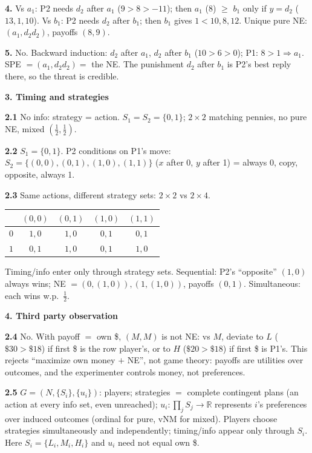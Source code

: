\documentclass[12pt]{article}
\begin{document}
\textbf{4.} Vs $a_1$: P2 needs $d_2$ after $a_1$ ($9>8>-11$); then $a_1$ (8) $\ge$ $b_1$ only if $y=d_2$ ($13,1,10$). Vs $b_1$: P2 needs $d_2$ after $b_1$; then $b_1$ gives $1<10,8,12$. Unique pure NE: $(a_1, d_2d_2)$, payoffs $(8,9)$.

\textbf{5.} No. Backward induction: $d_2$ after $a_1$, $d_2$ after $b_1$ ($10>6>0$); P1: $8>1\Rightarrow a_1$. SPE $=(a_1,d_2d_2)=$ the NE. The punishment $d_2$ after $b_1$ is P2's best reply there, so the threat is credible.

\medskip
\textbf{3. Timing and strategies}

\textbf{2.1} No info: strategy = action. $S_1=S_2=\{0,1\}$; $2\times2$ matching pennies, no pure NE, mixed $(\tfrac12,\tfrac12)$.

\textbf{2.2} $S_1=\{0,1\}$. P2 conditions on P1's move: $S_2=\{(0,0),(0,1),(1,0),(1,1)\}$ ($x$ after 0, $y$ after 1) = always 0, copy, opposite, always 1.

\textbf{2.3} Same actions, different strategy sets: $2\times2$ vs $2\times4$.
\begin{center}
\begin{tabular}{r|cccc}
 & $(0,0)$ & $(0,1)$ & $(1,0)$ & $(1,1)$ \\ \hline
$0$ & $1,0$ & $1,0$ & $0,1$ & $0,1$ \\
$1$ & $0,1$ & $1,0$ & $0,1$ & $1,0$
\end{tabular}
\end{center}
Timing/info enter only through strategy sets. Sequential: P2's ``opposite'' $(1,0)$ always wins; NE $=(0,(1,0)),(1,(1,0))$, payoffs $(0,1)$. Simultaneous: each wins w.p.\ $\tfrac12$.

\medskip
\textbf{4. Third party observation}

\textbf{2.4} No. With payoff $=$ own \$, $(M,M)$ is not NE: vs $M$, deviate to $L$ ($\$30>\$18$) if first \$ is the row player's, or to $H$ ($\$20>\$18$) if first \$ is P1's. This rejects ``maximize own money $+$ NE'', not game theory: payoffs are utilities over outcomes, and the experimenter controls money, not preferences.

\textbf{2.5} $G=(N,\{S_i\},\{u_i\})$: players; strategies $=$ complete contingent plans (an action at every info set, even unreached); $u_i:\prod_j S_j\to\mathbb{R}$ represents $i$'s preferences over induced outcomes (ordinal for pure, vNM for mixed). Players choose strategies simultaneously and independently; timing/info appear only through $S_i$. Here $S_i=\{L_i,M_i,H_i\}$ and $u_i$ need not equal own \$.
\end{document}
